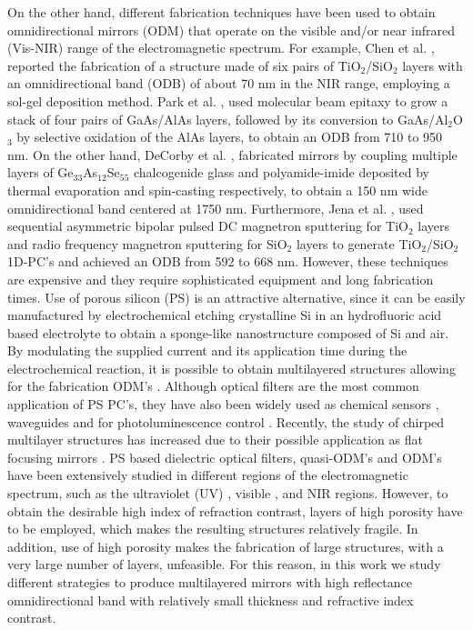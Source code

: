 \documentclass[a4paper,fleqn]{cas-sc}
\begin{document}
On the other hand, different fabrication techniques have been used to
obtain omnidirectional mirrors (ODM) that operate on the visible and/or
near infrared (Vis-NIR) range of the electromagnetic spectrum. For
example, Chen et al. \cite{Chen1999},
reported the fabrication of a structure made of six pairs of
TiO$_{2}$/SiO$_{2}$  layers with
an omnidirectional band (ODB) of about 70 nm in the NIR range, employing a sol-gel deposition
method. Park et al. \cite{Park2003}, used molecular beam epitaxy to
grow a stack of four pairs of GaAs/AlAs layers, followed by its conversion to
GaAs/Al$_{2}$O$_{3}$ by selective oxidation of the AlAs
layers, to obtain an ODB from 710 to 950 nm.
On the other hand, DeCorby et al. \cite{DeCorby2005}, fabricated mirrors by
coupling multiple layers of Ge$_{33}$As$_{12}$Se$_{55}$ chalcogenide glass and
polyamide-imide deposited by thermal evaporation and spin-casting
respectively, to obtain a 150 nm wide omnidirectional band centered at
1750 nm. Furthermore, Jena et al. \cite{Jena2019},
used sequential asymmetric bipolar pulsed DC magnetron sputtering for TiO$%
_{2}$ layers and radio frequency magnetron sputtering for SiO$_{2}$
layers to generate TiO$_{2}$/SiO$_{2}$ 1D-PC's and achieved an ODB from
592 to 668 nm. However, these techniques are expensive and they
require sophisticated equipment and long fabrication times. Use of
porous silicon (PS)
is an attractive alternative, since it can be easily manufactured by
electrochemical etching crystalline Si in an hydrofluoric
acid based electrolyte to obtain a sponge-like nanostructure composed
of Si and air. By modulating the supplied current and its application
time during the electrochemical reaction, it is possible to obtain
multilayered structures allowing for the fabrication ODM's \cite{Xifre2015,Pavesi2000}.
Although optical filters \cite{Estevez2009,Ariza2014} are the most common
application of PS PC's, they have also been widely used as chemical
sensors \cite{Giusseppe2011,Agarwal2018}, waveguides \cite{Hussel1997} and
for photoluminescence control \cite{Antunez2014}. Recently, the study of
chirped multilayer structures has
increased due to their possible application as flat focusing mirrors \cite{Wu2021,Kozar2017,Cheng2018}.
PS based dielectric optical filters, quasi-ODM's and ODM's have been extensively studied in different
regions of the electromagnetic spectrum, such as the ultraviolet (UV)
\cite{Jimenez2020}, visible \cite{Ariza2012}, and NIR \cite{Bruyant2003} regions.
However, to obtain the desirable high index of refraction
contrast, layers of high porosity have to be employed, which makes the
resulting structures relatively fragile. In addition, use of high
porosity makes the fabrication of large structures, with a
very large number of layers, unfeasible. For this reason, in this work
we study different strategies to produce multilayered mirrors
with high reflectance omnidirectional band
with relatively small thickness and refractive index contrast.
\end{document}
